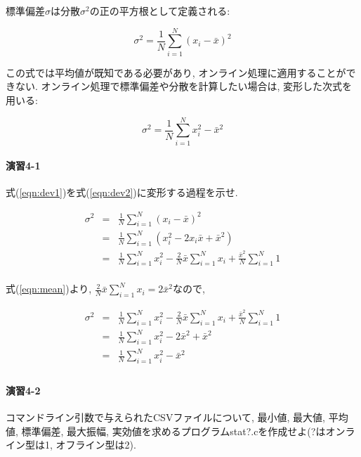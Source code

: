 \documentclass[titlepage]{jsarticle}
\begin{document}
        標準偏差$\sigma$は分散$\sigma^2$の正の平方根として定義される:
        
        \begin{equation} \label{eqn:dev1}
            \sigma^2 = \frac{1}{N} \sum_{i=1}^{N} (x_i - \bar{x})^2
        \end{equation}

        この式では平均値が既知である必要があり, オンライン処理に適用することができない.
        オンライン処理で標準偏差や分散を計算したい場合は, 変形した次式を用いる:

        \begin{equation} \label{eqn:dev2}
            \sigma^2 = \frac{1}{N} \sum_{i=1}^{N} x_i^2 - \bar{x}^2
        \end{equation}

    \paragraph{演習4-1} 式(\ref{eqn:dev1})を式(\ref{eqn:dev2})に変形する過程を示せ.
        
        \begin{eqnarray*}
            \sigma^2 &=& \frac{1}{N} \sum_{i=1}^{N} (x_i - \bar{x})^2 \\
            &=& \frac{1}{N} \sum_{i=1}^{N} (x_i^2 - 2x_i \bar{x} + \bar{x}^2) \\
            &=& \frac{1}{N} \sum_{i=1}^{N} x_i^2 - \frac{2}{N} \bar{x} \sum_{i=1}^{N} x_i + \frac{\bar{x}^2}{N} \sum_{i=1}^{N} 1 \\
        \end{eqnarray*}

        式(\ref{eqn:mean})より, $\frac{2}{N} \bar{x} \sum_{i=1}^{N} x_i = 2 \bar{x}^2$なので,

        \begin{eqnarray*}
            \sigma^2 &=& \frac{1}{N} \sum_{i=1}^{N} x_i^2 - \frac{2}{N} \bar{x} \sum_{i=1}^{N} x_i + \frac{\bar{x}^2}{N} \sum_{i=1}^{N} 1 \\
            &=& \frac{1}{N} \sum_{i=1}^{N} x_i^2 - 2 \bar{x}^2 + \bar{x}^2 \\
            &=& \frac{1}{N} \sum_{i=1}^{N} x_i^2 - \bar{x}^2 \\
        \end{eqnarray*}

    \paragraph{演習4-2} コマンドライン引数で与えられたCSVファイルについて, 最小値, 最大値, 平均値,
    標準偏差, 最大振幅, 実効値を求めるプログラムstat?.cを作成せよ(?はオンライン型は1,
    オフライン型は2).
\end{document}
